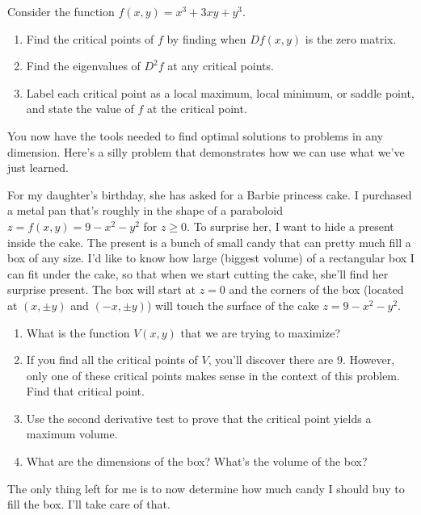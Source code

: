 \begin{problem}
Consider the function $f(x,y)=x^3 + 3xy +y^3$.  
\begin{enumerate}
 \item Find the critical points of $f$ by finding when $Df(x,y)$ is the zero matrix.
 \item Find the eigenvalues of $D^2f$ at any critical points.
 \item Label each critical point as a local maximum, local minimum, or saddle point, and state the value of $f$ at the critical point.
\end{enumerate}
\end{problem}

You now have the tools needed to find optimal solutions to problems in any dimension. Here's a silly problem that demonstrates how we can use what we've just learned.

\begin{problem}\label{optimize box in cake}
For my daughter's birthday, she has asked for a Barbie princess cake. I purchased a metal pan that's roughly in the shape of a paraboloid $z=f(x,y)=9-x^2-y^2$ for $z\geq 0$. To surprise her, I want to hide a present inside the cake. The present is a bunch of small candy that can pretty much fill a box of any size.  I'd like to know how large (biggest volume) of a rectangular box I can fit under the cake, so that when we start cutting the cake, she'll find her surprise present. The box will start at $z=0$ and the corners of the box (located at $(x,\pm y)$ and $(-x,\pm y)$) will touch the surface of the cake $z=9-x^2-y^2$.  
\begin{enumerate}
 \item What is the function $V(x,y)$ that we are trying to maximize?
 \item If you find all the critical points of $V$, you'll discover there are 9.  However, only one of these critical points makes sense in the context of this problem. Find that critical point.
 \item Use the second derivative test to prove that the critical point yields a maximum volume.
 \item What are the dimensions of the box? What's the volume of the box?
\end{enumerate}
 The only thing left for me is to now determine how much candy I should buy to fill the box. I'll take care of that.
\end{problem}
 

